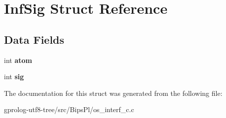 \hypertarget{structInfSig}{}\section{Inf\+Sig Struct Reference}
\label{structInfSig}
\subsection*{Data Fields}
\begin{DoxyCompactItemize}
\item 
int {\bfseries atom}\hypertarget{structInfSig_a802a7fecafff618606688d70860c6ce4}{}\label{structInfSig_a802a7fecafff618606688d70860c6ce4}

\item 
int {\bfseries sig}\hypertarget{structInfSig_a089058351323d661ad411c87017b6647}{}\label{structInfSig_a089058351323d661ad411c87017b6647}

\end{DoxyCompactItemize}


The documentation for this struct was generated from the following file\+:\begin{DoxyCompactItemize}
\item 
gprolog-\/utf8-\/tree/src/\+Bips\+Pl/os\+\_\+interf\+\_\+c.\+c\end{DoxyCompactItemize}
